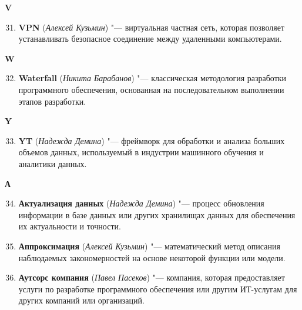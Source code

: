 \begin{flushleft} \large\textbf{V} \end{flushleft}

\begin{enumerate}
    \setcounter{enumi}{30}

    \item \textbf{VPN} (\textit{Алексей Кузьмин}) "--- 
    виртуальная частная сеть, которая позволяет устанавливать безопасное соединение между удаленными компьютерами. 
\end{enumerate}

\begin{flushleft} \large\textbf{W} \end{flushleft}

\begin{enumerate}
    \setcounter{enumi}{31}

    \item \textbf{Waterfall} (\textit{Никита Барабанов}) "--- 
    классическая методология разработки программного обеспечения, основанная на последовательном выполнении этапов разработки. 
\end{enumerate}

\begin{flushleft} \large\textbf{Y} \end{flushleft}

\begin{enumerate}
    \setcounter{enumi}{32}

    \item \textbf{YT} (\textit{Надежда Демина}) "--- 
    фреймворк для обработки и анализа больших объемов данных, используемый в индустрии машинного обучения и аналитики данных.
\end{enumerate}

\begin{flushleft} \large\textbf{А} \end{flushleft}

\begin{enumerate}
    \setcounter{enumi}{33}

    \item \textbf{Актуализация данных} (\textit{Надежда Демина}) "--- 
    процесс обновления информации в базе данных или других хранилищах данных для обеспечения их актуальности и точности.

    \item \textbf{Аппроксимация} (\textit{Алексей Кузьмин}) "--- 
    математический метод описания наблюдаемых закономерностей на основе некоторой функции или модели.

    \item \textbf{Аутсорс компания} (\textit{Павел Пасеков}) "--- 
    компания, которая предоставляет услуги по разработке программного обеспечения или другим ИТ-услугам для других компаний или организаций. 
\end{enumerate}

